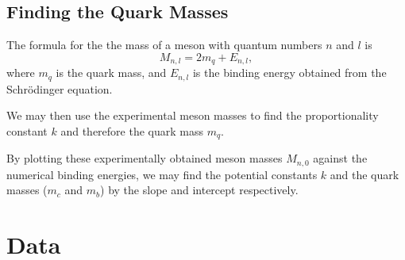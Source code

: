 \documentclass[]{article}
\begin{document}
\subsection{Finding the Quark Masses}

The formula for the the mass of a meson with quantum numbers $n$ and $l$ is $$M_{n,l} = 2m_{q} + E_{n,l},$$ where $m_{q}$ is the quark mass, and $E_{n,l}$ is the binding energy obtained from the Schr\"{o}dinger equation.

We may then use the experimental meson masses to find the  proportionality constant $k$ and therefore the quark mass $m_{q}$.

\begin{table}[H]
	\begin{center}
		\quad %
		\caption{Meson Masses in \GeV.}
		\label{tab:mesonmasses}
	\end{center}  
\end{table}

By plotting these experimentally obtained meson masses $M_{n,0}$ against the numerical binding energies, we may find the potential constants $k$ and the quark masses ($m_{c}$ and $m_{b}$) by the slope and intercept respectively.


\section{Data}
\end{document}
